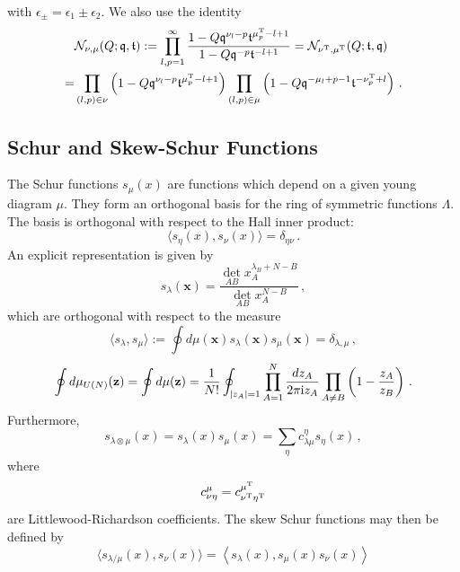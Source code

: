 \documentclass[main.tex]{subfiles}
\begin{document}
with $\epsilon_{\pm}=\epsilon_1\pm\epsilon_2$.
We also use the identity
\begin{align}
&\mathcal{N}_{\nu,\mu}(Q;\mathfrak{q},\mathfrak{t}):=\prod_{l,p=1}^{\infty}\frac{1-Q\mathfrak{q}^{\nu_l-p}\mathfrak{t}^{\mu_p^{\operatorname{T}}-l+1}}{1-Q\mathfrak{q}^{-p}\mathfrak{t}^{-l+1}}=\mathcal{N}_{\nu^{\operatorname{T}},\mu^{\operatorname{T}}}(Q;\mathfrak{t},\mathfrak{q})\label{eqn:nekfun}\\
=&\prod_{(l,p)\in\nu}\left(1-Q\mathfrak{q}^{\nu_l-p}\mathfrak{t}^{\mu_p^{\operatorname{T}}-l+1}\right)\prod_{(l,p)\in\mu}\left(1-Q\mathfrak{q}^{-\mu_l+p-1}\mathfrak{t}^{-\nu_p^{\operatorname{T}}+l}\right)\,.
\end{align}

\subsection{Schur and Skew-Schur Functions}
The Schur functions $s_{\mu}(x)$ are functions which depend on a given young diagram $\mu$. They form an orthogonal basis for the ring of symmetric functions $\Lambda$. The basis is orthogonal with respect to the Hall inner product:
\begin{equation}
\langle s_{\eta}(x),s_{\nu}(x)\rangle=\delta_{\eta\nu}\,.
\end{equation}
An explicit representation is given by
\begin{equation}\label{eqn:schurpolyrepn}
s_{\lambda}(\mathbf{x})=\frac{\det_{AB} x_A^{\lambda_B+N-B}}{\det_{AB} x_A^{N-B}}\,,
\end{equation}
which are orthogonal with respect to the measure
\begin{equation}
\langle s_{\lambda},s_{\mu}\rangle:=\oint d\mu(\mathbf{x})s_{\lambda}(\mathbf{x})s_{\mu}(\mathbf{x})=\delta_{\lambda,\mu}\,,
\end{equation}
\begin{equation}\label{eqn:schurmeasure}
\oint d\mu_{U(N)}(\mathbf{z})=\oint d\mu(\mathbf{z})=\frac{1}{N!}\oint_{|z_A|=1}\prod_{A=1}^N\frac{dz_A}{2\pi\mathrm{i} z_A}\prod_{A\neq B}\left(1-\frac{z_A}{z_B}\right)\,.
\end{equation}
Furthermore,
\begin{equation}\label{eqn:HLcoeff}
s_{\lambda\otimes\mu}(x)=s_{\lambda}(x)s_{\mu}(x)=\sum_{\eta}c_{\lambda\mu}^{\eta}s_{\eta}(x)\,,
\end{equation}
where 
\begin{equation}
c_{\nu\eta}^{\mu}=c_{\nu^{\operatorname{T}}\eta^{\operatorname{T}}}^{\mu^{\operatorname{T}}}
\end{equation} 
are Littlewood-Richardson coefficients. The skew Schur functions may then be defined by
\begin{equation}
\langle s_{\lambda/\mu}(x),s_{\nu}(x)\rangle=\left\langle s_{\lambda}(x),s_{\mu}(x)s_{\nu}(x)\right\rangle
\end{equation}
\end{document}
